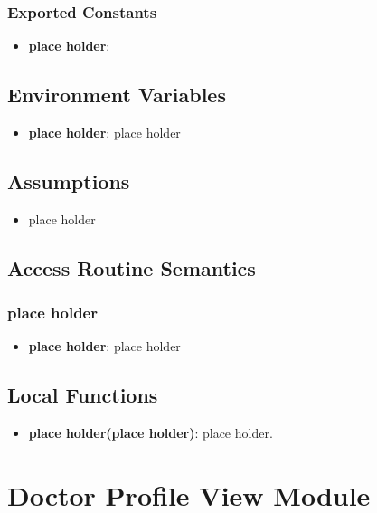\documentclass[12pt, titlepage]{article}
\begin{document}
\subsubsection{Exported Constants}
\begin{itemize}
\item \textbf{place holder}:
\end{itemize}

\subsection{Environment Variables}
\begin{itemize}
\item \textbf{place holder}: place holder
\end{itemize}

\subsection{Assumptions}
\begin{itemize}
\item place holder
\end{itemize}

\subsection{Access Routine Semantics}
\subsubsection{place holder}
\begin{itemize}
    \item \textbf{place holder}: place holder
\end{itemize}

\subsection{Local Functions}
\begin{itemize}
\item \textbf{place holder(place holder)}: place holder.
\end{itemize}

\section{Doctor Profile View Module}
\end{document}
